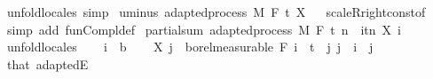 \begin{isabellebody}
\ {\isacharparenleft}{\kern0pt}unfold{\isacharunderscore}{\kern0pt}locales{\isacharparenright}{\kern0pt}\ simp%
\endisatagproof
{\isafoldproof}%
%
\isadelimproof
\isanewline
%
\endisadelimproof
\isanewline
{}\isamarkupfalse%
\ uminus{\isacharcolon}{\kern0pt}\ {\isachardoublequoteopen}adapted{\isacharunderscore}{\kern0pt}process\ M\ F\ t\ {\isacharparenleft}{\kern0pt}{\isacharminus}{\kern0pt}X{\isacharparenright}{\kern0pt}{\isachardoublequoteclose}%
\isadelimproof
\ %
\endisadelimproof
%
\isatagproof
{}\isamarkupfalse%
\ scaleR{\isacharunderscore}{\kern0pt}right{\isacharunderscore}{\kern0pt}const{\isacharbrackleft}{\kern0pt}of\ {\isachardoublequoteopen}{\isasymlambda}{\isacharunderscore}{\kern0pt}{\isachardot}{\kern0pt}\ {\isacharminus}{\kern0pt}{}{\isachardoublequoteclose}{\isacharbrackright}{\kern0pt}\ \isamarkupfalse%
\ {\isacharparenleft}{\kern0pt}simp\ add{\isacharcolon}{\kern0pt}\ fun{\isacharunderscore}{\kern0pt}Compl{\isacharunderscore}{\kern0pt}def{\isacharparenright}{\kern0pt}%
\endisatagproof
{\isafoldproof}%
%
\isadelimproof
%
\endisadelimproof
\isanewline
\isanewline
{}\isamarkupfalse%
\ partial{\isacharunderscore}{\kern0pt}sum{\isacharcolon}{\kern0pt}\ {\isachardoublequoteopen}adapted{\isacharunderscore}{\kern0pt}process\ M\ F\ t\ {\isacharparenleft}{\kern0pt}{\isasymlambda}n\ {\isasymxi}{\isachardot}{\kern0pt}\ {\isasymSum}i{\isasymin}{\isacharbraceleft}{\kern0pt}tn{\isacharbraceright}{\kern0pt}{\isachardot}{\kern0pt}\ X\ i\ {\isasymxi}{\isacharparenright}{\kern0pt}{\isachardoublequoteclose}\ \isanewline
%
\isadelimproof
%
\endisadelimproof
%
\isatagproof
{}\isamarkupfalse%
\ {\isacharparenleft}{\kern0pt}unfold{\isacharunderscore}{\kern0pt}locales{\isacharparenright}{\kern0pt}\isanewline
\ \ \isamarkupfalse%
\ i\ {\isacharcolon}{\kern0pt}{\isacharcolon}{\kern0pt}\ {\isacharprime}{\kern0pt}b\isanewline
\ \ \isamarkupfalse%
\ {\isachardoublequoteopen}X\ j\ {\isasymin}\ borel{\isacharunderscore}{\kern0pt}measurable\ {\isacharparenleft}{\kern0pt}F\ i{\isacharparenright}{\kern0pt}{\isachardoublequoteclose}\ \ {\isachardoublequoteopen}t\ {\isasymle}\ j{\isachardoublequoteclose}\ {\isachardoublequoteopen}j\ {\isacharless}{\kern0pt}\ i{\isachardoublequoteclose}\ \ j\ \isamarkupfalse%
\ that\ adaptedE\ \isamarkupfalse%

\end{isabellebody}
